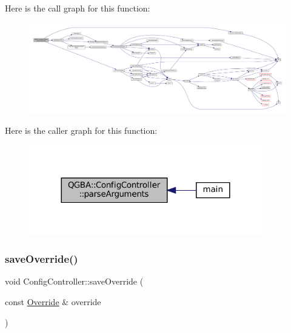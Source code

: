 Here is the call graph for this function\+:
\nopagebreak
\begin{figure}[H]
\begin{center}
\leavevmode
\includegraphics[width=350pt]{class_q_g_b_a_1_1_config_controller_a5a1bc56dda151c14559105f1da5af88b_cgraph}
\end{center}
\end{figure}
Here is the caller graph for this function\+:
\nopagebreak
\begin{figure}[H]
\begin{center}
\leavevmode
\includegraphics[width=288pt]{class_q_g_b_a_1_1_config_controller_a5a1bc56dda151c14559105f1da5af88b_icgraph}
\end{center}
\end{figure}
\mbox{\label{class_q_g_b_a_1_1_config_controller_a3b27eca39ad08c332c65ee00e9aa7038}} 
\subsubsection{\texorpdfstring{save\+Override()}{saveOverride()}}
{\footnotesize\ttfamily void Config\+Controller\+::save\+Override (\begin{DoxyParamCaption}\item[{const \mbox{\hyperlink{class_q_g_b_a_1_1_override}{Override}} \&}]{override }\end{DoxyParamCaption})}

